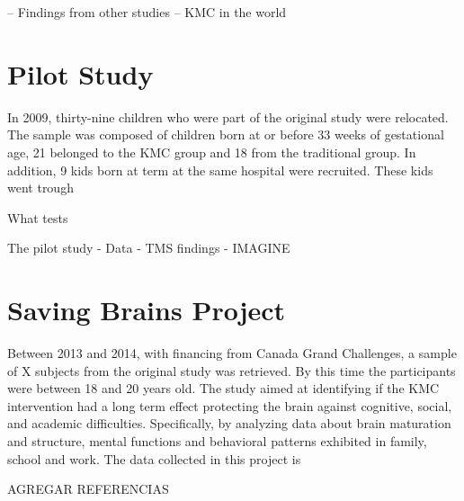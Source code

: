 
-- Findings from other studies
-- KMC in the world

\section{Pilot Study}

In 2009, thirty-nine children who were part of the original study were relocated. The sample was composed of children born at or before 33 weeks of gestational age, 21 belonged to the KMC group and 18 from the traditional group. In addition, 9 kids born at term at the same hospital were recruited. These kids went trough

What tests



The pilot study
 - Data
 - TMS findings
 - IMAGINE


\section{Saving Brains Project}




Between 2013 and 2014, with financing from Canada Grand Challenges, a sample of X subjects from the original study was retrieved. By this time the participants were between 18 and 20 years old. The study aimed at identifying if the KMC intervention had a long term effect protecting the brain against cognitive, social, and academic difficulties. Specifically, by analyzing data about  brain maturation and structure, mental functions and behavioral patterns exhibited in family, school and work. The data collected in this project is 

AGREGAR REFERENCIAS

